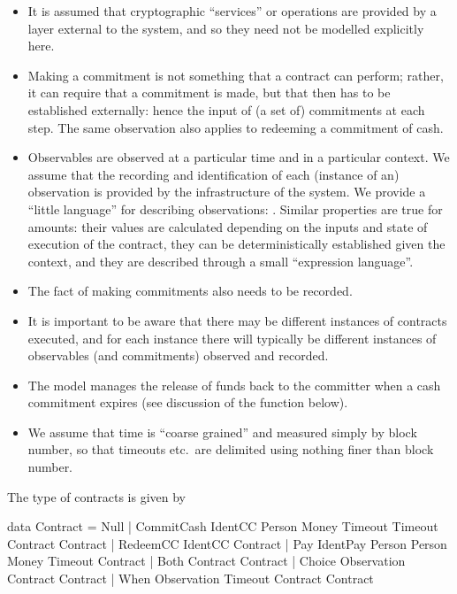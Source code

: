 \documentclass[
      acmsmall
    , screen
    , review=true
  ]{acmart}
\begin{document}
\begin{itemize}
\item It is assumed that cryptographic ``services'' or operations are provided by a layer external to the system, and so they need not be modelled explicitly here.
\item Making a commitment is not something that a contract can perform; rather, it can require that a commitment is made, but that then has to be established externally: hence the input of (a set of) commitments at each step. The same observation also applies to redeeming a commitment of cash.
\item Observables are observed at a particular time and in a particular context. We assume that the recording and 
identification of each (instance of an) observation is provided by the infrastructure of the system. We provide a 
``little language'' for describing observations: . Similar properties are true for
 amounts: their values are calculated depending on the inputs and state of execution of the 
contract, they can be deterministically established given the context, and they are described through a small 
``expression language''.
\item The fact of making commitments also needs to be recorded.
\item It is important to be aware that there may be different instances of contracts executed, and for each instance there will typically be different instances of observables (and commitments) observed and recorded.
\item The model manages the release of funds back to the committer when a cash commitment expires (see discussion of the  function below).
\item We assume that time is ``coarse grained'' and measured simply by block number, so that timeouts etc.\ are delimited using nothing finer than block number. 
\end{itemize}

\medskip
\noindent
The type of contracts is given by

\begin{haskellcode}
data Contract =
   Null |
   CommitCash IdentCC Person Money Timeout Timeout Contract Contract |  
   RedeemCC IdentCC Contract |
   Pay IdentPay Person Person Money Timeout Contract |  
   Both Contract Contract |
   Choice Observation Contract Contract |
   When Observation Timeout Contract Contract   
   \end{haskellcode}
\end{document}
